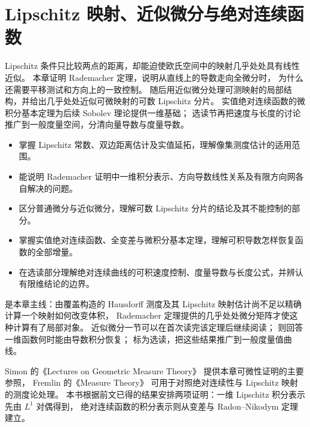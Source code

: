 \chapter{Lipschitz 映射、近似微分与绝对连续函数}
\label{b1:ch:16}
\begin{chapterabstract}
Lipschitz 条件只比较两点的距离，却能迫使欧氏空间中的映射几乎处处具有线性近似。
本章证明 Rademacher 定理，说明从直线上的导数走向全微分时，
为什么还需要平移测试和方向上的一致控制。
随后用近似微分处理可测映射的局部结构，并给出几乎处处近似可微映射的可数 Lipschitz 分片。
实值绝对连续函数的微积分基本定理为后续 Sobolev 理论提供一维基础；
选读节再把速度与长度的讨论推广到一般度量空间，分清向量导数与度量导数。
\end{chapterabstract}

\begin{learninggoals}
\begin{itemize}
\item\label{b1:item:ch16-goal-extension}掌握 Lipschitz 常数、双边距离估计及实值延拓，理解像集测度估计的适用范围。
\item\label{b1:item:ch16-goal-rademacher}能说明 Rademacher 证明中一维积分表示、方向导数线性关系及有限方向网各自解决的问题。
\item\label{b1:item:ch16-goal-approximate}区分普通微分与近似微分，理解可数 Lipschitz 分片的结论及其不能控制的部分。
\item\label{b1:item:ch16-goal-ac}掌握实值绝对连续函数、全变差与微积分基本定理，理解可积导数怎样恢复函数的全部增量。
\item\label{b1:item:ch16-goal-curves}在选读部分理解绝对连续曲线的可积速度控制、度量导数与长度公式，并辨认有限维结论的边界。
\end{itemize}
\end{learninggoals}

是本章主线：由覆盖构造的 Hausdorff 测度及其 Lipschitz 映射估计尚不足以精确计算一个映射如何改变体积，
Rademacher 定理提供的几乎处处微分矩阵才使这种计算有了局部对象。
近似微分一节可以在首次读完该定理后继续阅读；
则回答一维函数何时能由导数积分恢复；
标为选读，把这些结果推广到一般度量值曲线。

\ProseParagraphBreak

Simon 的《Lectures on Geometric Measure Theory》%
\cite[\S5]{Simon1983Lectures}提供本章可微性证明的主要参照，
Fremlin 的《Measure Theory》%
\cite[\S\S225 and 262]{Fremlin2016Measure}可用于对照绝对连续性与 Lipschitz 映射的测度论处理。
本书根据前文已得的结果安排两项证明：一维 Lipschitz 积分表示先由 \(L^1\) 对偶得到，
绝对连续函数的积分表示则从变差与 Radon--Nikodym 定理建立。

